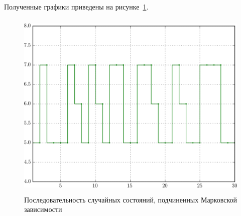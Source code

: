 Полученные графики приведены на рисунке~\ref{pic:chain}.
\begin{figure}[h]
  \centering
  \includegraphics[width=150mm, height=92mm]{pic/chain}
  \caption{Последовательность случайных состояний, 
    подчиненных Марковской зависимости}
  \label{pic:chain} 
\end{figure}

\pagebreak